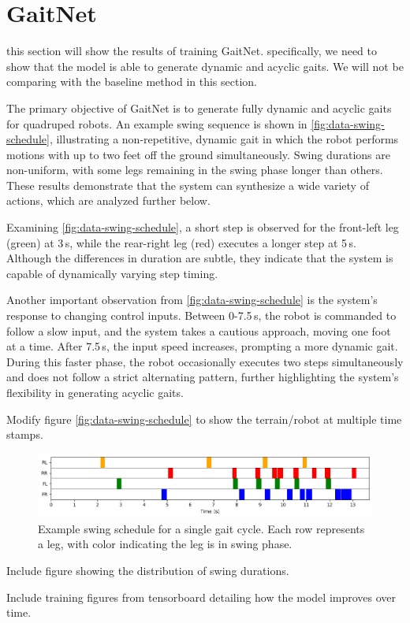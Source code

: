 \section{GaitNet}

\begin{todo}
  this section will show the results of training GaitNet.
  specifically, we need to show that the model is able to generate
  dynamic and acyclic gaits. We will not be comparing with the baseline
  method in this section.
\end{todo}

The primary objective of GaitNet is to generate fully dynamic and
acyclic gaits for quadruped robots. An example swing sequence is
shown in \autoref{fig:data-swing-schedule}, illustrating a
non-repetitive, dynamic gait in which the robot performs motions with
up to two feet off the ground simultaneously. Swing durations are
non-uniform, with some legs remaining in the swing phase longer than
others. These results demonstrate that the system can synthesize a
wide variety of actions, which are analyzed further below.

Examining \autoref{fig:data-swing-schedule}, a short step is observed
for the front-left leg (green) at 3\,s, while the rear-right leg
(red) executes a longer step at 5\,s. Although the differences in
duration are subtle, they indicate that the system is capable of
dynamically varying step timing.

Another important observation from \autoref{fig:data-swing-schedule}
is the system's response to changing control inputs. Between
0-7.5\,s, the robot is commanded to follow a slow input, and the
system takes a cautious approach, moving one foot at a time. After
7.5\,s, the input speed increases, prompting a more dynamic gait.
During this faster phase, the robot occasionally executes two steps
simultaneously and does not follow a strict alternating pattern,
further highlighting the system's flexibility in generating acyclic gaits.

\begin{todo}
  Modify figure \autoref{fig:data-swing-schedule} to show
  the terrain/robot at multiple time stamps.
\end{todo}

\begin{figure}[H]
  \centering
  \includegraphics[width=\textwidth]{images/data/swing-schedule.png}
  \caption{Example swing schedule for a single gait cycle. Each row
  represents a leg, with color indicating the leg is in swing phase.}
  \label{fig:data-swing-schedule}
\end{figure}

\begin{todo}
  Include figure showing the distribution of swing durations.
\end{todo}

\begin{todo}
  Include training figures from tensorboard detailing how the model
  improves over time.
\end{todo}
